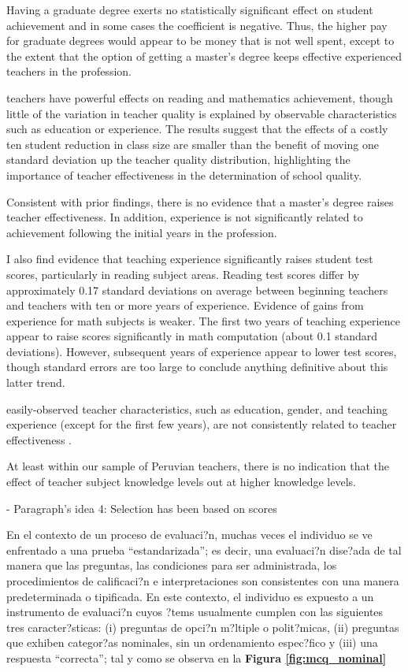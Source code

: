Having a graduate degree exerts no statistically significant effect on student achievement and in some cases the coefficient is negative. Thus, the higher pay for graduate degrees would appear to be money that is not well spent, except to the extent that the option of getting a master’s degree keeps effective experienced teachers in the profession. \citep{Clotfelter_et_al_2007}


teachers have powerful effects on reading and mathematics achievement, though little of the variation in teacher quality is explained by observable characteristics such as education or experience. The results suggest that the effects of a costly ten student reduction in class size are smaller than the benefit of moving one standard deviation up the teacher quality
distribution, highlighting the importance of teacher effectiveness in the determination
of school quality. \citep{Rivkin_et_al_2005}

Consistent with prior findings, there is no evidence that a master’s degree raises teacher effectiveness. In addition, experience is not significantly related to achievement following the initial years in the profession. \citep{Rivkin_et_al_2005}

I also find evidence that teaching experience significantly raises student test scores, particularly in reading subject areas. Reading test scores differ by approximately 0.17 standard deviations on average between beginning teachers and teachers with ten or more years of experience. Evidence of gains from experience for math subjects is weaker. The first two years of teaching experience appear to raise scores significantly in math computation (about 0.1 standard deviations). However, subsequent years of experience appear to lower test scores, though standard errors are too large to conclude anything definitive about this latter trend. \citep{Rockoff_2004}


easily-observed teacher characteristics, such as education, gender, and teaching experience (except for the first few years), are not consistently related to teacher effectiveness \citep{Hanushek_et_al_2006}.


At least within our sample of Peruvian teachers, there is no indication that the effect
of teacher subject knowledge levels out at higher knowledge levels. \citep{Metzler_et_al_2012}



- Paragraph's idea 4: Selection has been based on scores

En el contexto de un proceso de evaluaci?n, muchas veces el individuo se ve enfrentado a una prueba ``estandarizada''; es decir, una evaluaci?n dise?ada de tal manera que las preguntas, las condiciones para ser administrada, los procedimientos de calificaci?n e interpretaciones son consistentes con una manera predeterminada o tipificada. En este contexto, el individuo es expuesto a un instrumento de evaluaci?n cuyos ?tems usualmente cumplen con las siguientes tres caracter?sticas: (i) preguntas de opci?n m?ltiple o polit?micas, (ii) preguntas que exhiben categor?as nominales, sin un ordenamiento espec?fico y (iii) una respuesta ``correcta''; tal y como se observa en la \textbf{Figura \ref{fig:mcq_nominal}}

